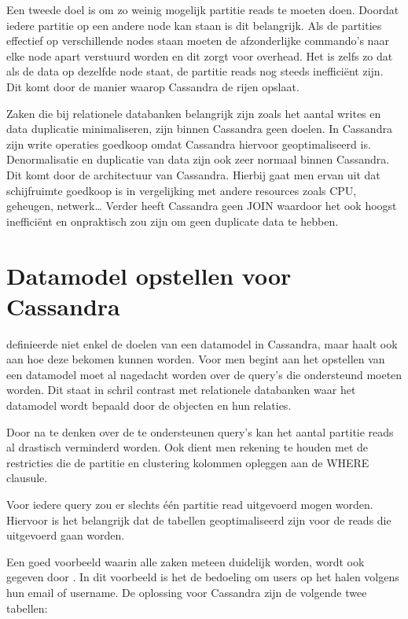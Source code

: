 Een tweede doel is om zo weinig mogelijk partitie reads te moeten doen.
Doordat iedere partitie op een andere node kan staan is dit belangrijk.
Als de partities effectief op verschillende nodes staan moeten de afzonderlijke commando's naar elke node apart verstuurd worden en dit zorgt voor overhead.
Het is zelfs zo dat als de data op dezelfde node staat, de partitie reads nog steeds inefficiënt zijn.
Dit komt door de manier waarop Cassandra de rijen opslaat.

Zaken die bij relationele databanken belangrijk zijn zoals het aantal writes en data duplicatie minimaliseren, zijn binnen Cassandra geen doelen.
In Cassandra zijn write operaties goedkoop omdat Cassandra hiervoor geoptimaliseerd is.
Denormalisatie en duplicatie van data zijn ook zeer normaal binnen Cassandra.
Dit komt door de architectuur van Cassandra.
Hierbij gaat men ervan uit dat schijfruimte goedkoop is in vergelijking met andere resources zoals CPU, geheugen, netwerk\dots
Verder heeft Cassandra geen JOIN waardoor het ook hoogst inefficiënt en onpraktisch zou zijn om geen duplicate data te hebben.

\section{Datamodel opstellen voor Cassandra}
\cite{Hobbs2015Datamodelling} definieerde niet enkel de doelen van een datamodel in Cassandra, maar haalt ook aan hoe deze bekomen kunnen worden.
Voor men begint aan het opstellen van een datamodel moet al nagedacht worden over de query's die ondersteund moeten worden.
Dit staat in schril contrast met relationele databanken waar het datamodel wordt bepaald door de objecten en hun relaties.

Door na te denken over de te ondersteunen query's kan het aantal partitie reads al drastisch verminderd worden.
Ook dient men rekening te houden met de restricties die de partitie en clustering kolommen opleggen aan de WHERE clausule.

Voor iedere query zou er slechts één partitie read uitgevoerd mogen worden.
Hiervoor is het belangrijk dat de tabellen geoptimaliseerd zijn voor de reads die uitgevoerd gaan worden.

Een goed voorbeeld waarin alle zaken meteen duidelijk worden, wordt ook gegeven door \cite{Hobbs2015Datamodelling} .
In dit voorbeeld is het de bedoeling om users op het halen volgens hun email of username.
De oplossing voor Cassandra zijn de volgende twee tabellen:

